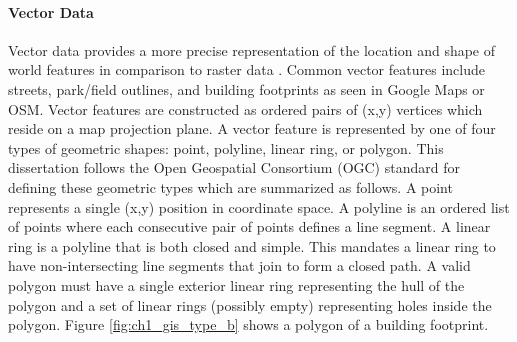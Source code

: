 


\paragraph{Vector Data}

Vector data provides a more precise representation of the location and shape of world features in comparison to raster data \cite{GIS_demystified}. Common vector features include streets, park/field outlines, and building footprints as seen in Google Maps or \ac{OSM}. Vector features are constructed as ordered pairs of (x,y) vertices which reside on a map projection plane.  A vector feature is represented by one of four types of geometric shapes: point, polyline, linear ring, or polygon. This dissertation follows the Open Geospatial Consortium (OGC) standard \cite{herring_opengis_2006-1} for defining these geometric types which are summarized as follows. A point represents a single (x,y) position in coordinate space. A polyline is an ordered list of points where each consecutive pair of points defines a line segment. A linear ring is a polyline that is both closed and simple. This mandates a linear ring to have non-intersecting line segments that join to form a closed path. A valid polygon must have a single exterior linear ring representing the hull of the polygon and a set of linear rings (possibly empty) representing holes inside the polygon. Figure \ref{fig:ch1_gis_type_b} shows a polygon of a building footprint.


